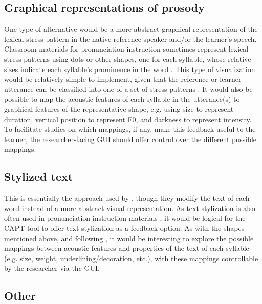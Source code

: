 	
	\subsection{Graphical representations of prosody}
	\label{sec:visual:graphical}
	

	One type of alternative would be a more abstract graphical representation of the lexical stress pattern in the native reference speaker and/or the learner's speech. Classroom materials for pronunciation instruction sometimes represent lexical stress patterns using dots or other shapes, one for each syllable, whose relative sizes indicate each syllable's prominence in the word \citep{Hirschfeld1998}. This type of visualization would be relatively simple to implement, given that the reference or learner utterance can be classified into one of a set of stress patterns \citep{Kim2011,Shahin2012a}. It would also be possible to map the acoustic features of each syllable in the utterance(s) to graphical features of the representative shape, e.g. using size to represent duration, vertical position to represent F0, and darkness to represent intensity. To facilitate studies on which mappings, if any, make this feedback useful to the learner, the researcher-facing GUI should offer control over the different possible mappings.
	
	
	\subsection{Stylized text}
	\label{sec:visual:text}
	
	This is essentially the approach used by \textcite{Sitaram2011}, though they modify the text of each word instead of a more abstract visual representation. As text stylization is also often used in pronunciation instruction materials \citep{Behme-Gissel2005,Hirschfeld2007a}, it would be logical for the CAPT tool to offer text stylization as a feedback option. As with the shapes mentioned above, and following \textcite{Sitaram2011}, it would be interesting to explore the possible mappings between acoustic features and properties of the text of each syllable (e.g. size, weight, underlining/decoration, etc.), with these mappings controllable by the researcher via the GUI.



\subsection{Other}
\label{sec:visual:other}


